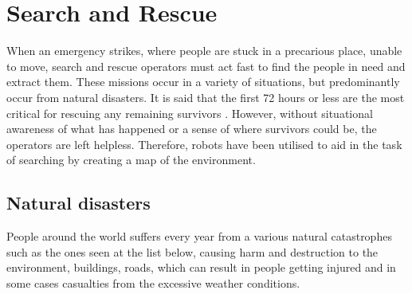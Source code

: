 \section{Search and Rescue}\label{sec:Search_and_Rescue}
When an emergency strikes, where people are stuck in a precarious place, unable to move, search and rescue operators must act fast to find the people in need and extract them. These missions occur in a variety of situations, but predominantly occur from natural disasters. It is said that the first 72 hours or less are the most critical for rescuing any remaining survivors \cite{SearchAndRescue:SAR_with_flying_robots}. However, without situational awareness of what has happened or a sense of where survivors could be, the operators are left helpless. Therefore, robots have been utilised to aid in the task of searching by creating a map of the environment.

\subsection{Natural disasters}
People around the world suffers every year from a various natural catastrophes such as the ones seen at the list below, causing harm and destruction to the environment, buildings, roads, which can result in people getting injured and in some cases casualties from the excessive weather conditions.

